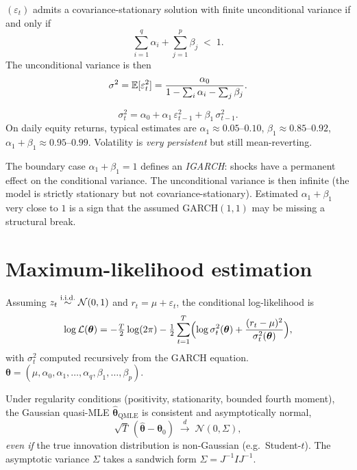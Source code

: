 \begin{propbox}
\label{prop:garch-stat}
$(\varepsilon_t)$ admits a covariance-stationary solution with
finite unconditional variance if and only if
\[
  \sum_{i = 1}^{q} \alpha_i + \sum_{j = 1}^{p} \beta_j \;<\; 1.
\]
The unconditional variance is then
\[
  \sigma^2 = \mathbb{E}[\varepsilon_t^2]
          = \frac{\alpha_0}{1 - \sum_i \alpha_i - \sum_j \beta_j}.
\]
\end{propbox}

\begin{exbox}
\label{ex:garch11}
\[
  \sigma_t^2 = \alpha_0
             + \alpha_1\, \varepsilon_{t-1}^2
             + \beta_1\, \sigma_{t-1}^2.
\]
On daily equity returns, typical estimates are $\alpha_1 \approx
0.05$--$0.10$, $\beta_1 \approx 0.85$--$0.92$,
$\alpha_1 + \beta_1 \approx 0.95$--$0.99$. Volatility is
\emph{very persistent} but still mean-reverting.
\end{exbox}

\begin{rembox}
The boundary case $\alpha_1 + \beta_1 = 1$ defines an
\emph{IGARCH}: shocks have a permanent effect on the conditional
variance. The unconditional variance is then infinite (the model
is strictly stationary but not covariance-stationary). Estimated
$\alpha_1 + \beta_1$ very close to $1$ is a sign that the assumed
GARCH$(1, 1)$ may be missing a structural break.
\end{rembox}

\section{Maximum-likelihood estimation}
\label{sec:garch-mle}

\begin{defbox}
\label{def:garch-mle}
Assuming $z_t \overset{\text{i.i.d.}}{\sim} \mathcal N(0, 1)$ and $r_t = \mu + \varepsilon_t$,
the conditional log-likelihood is
\[
  \log \mathcal L(\bm\theta)
  = -\tfrac{T}{2}\log(2 \pi)
    -\tfrac{1}{2} \sum_{t = 1}^{T}
        \Bigl(
            \log \sigma_t^2(\bm\theta)
            + \frac{(r_t - \mu)^2}{\sigma_t^2(\bm\theta)}
        \Bigr),
\]
with $\sigma_t^2$ computed recursively from the GARCH equation.
$\bm\theta = (\mu, \alpha_0, \alpha_1, \dots, \alpha_q,
\beta_1, \dots, \beta_p)$.
\end{defbox}

\begin{thbox}
Under regularity conditions (positivity, stationarity, bounded
fourth moment), the Gaussian quasi-MLE
$\widehat{\bm\theta}_{\text{QMLE}}$ is consistent and
asymptotically normal,
\[
  \sqrt{T}\,(\widehat{\bm\theta} - \bm\theta_0)
  \;\xrightarrow{d}\; \mathcal N(0, \Sigma),
\]
\emph{even if} the true innovation distribution is non-Gaussian
(e.g.\ Student-$t$). The asymptotic variance $\Sigma$ takes a
sandwich form $\Sigma = J^{-1} I J^{-1}$.
\end{thbox}

